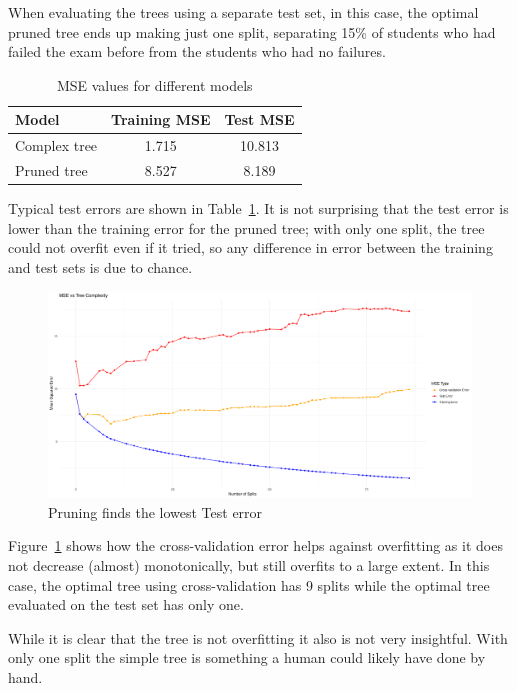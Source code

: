 \documentclass[12pt]{article}
\begin{document}
When evaluating the trees using a separate test set, in this case, the optimal pruned tree ends up making just one split, separating 15\% of students who had failed the exam before from the students who had no failures.

\begin{table}
    \centering
    \begin{tabular}{| l | c | c |}
        \hline
        Model        & Training MSE & Test MSE \\
        \hline
        Complex tree & 1.715        & 10.813   \\
        Pruned tree  & 8.527        & 8.189    \\
        \hline
    \end{tabular}
    \caption{MSE values for different models}
    \label{table_pruning}
\end{table}

Typical test errors are shown in Table~\ref{table_pruning}. It is not surprising that the test error is lower than the training error for the pruned tree; with only one split, the tree could not overfit even if it tried, so any difference in error between the training and test sets is due to chance.

\begin{figure}
    \centering
    \includegraphics[scale=0.30]{triple_pruning_plot.pdf}
    \caption{Pruning finds the lowest Test error}
    \label{prune}
\end{figure}

Figure~\ref{prune} shows how the cross-validation error helps against overfitting as it does not decrease (almost) monotonically, but still overfits to a large extent. In this case, the optimal tree using cross-validation has 9 splits while the optimal tree evaluated on the test set has only one.

While it is clear that the tree is not overfitting it also is not very insightful. With only one split the simple tree is something a human could likely have done by hand.
\end{document}
